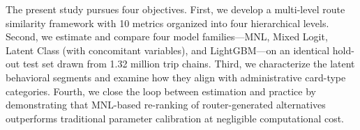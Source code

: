 The present study pursues four objectives. First, we develop a multi-level
route similarity framework with 10 metrics organized into four hierarchical
levels. Second, we estimate and compare four model families---MNL, Mixed
Logit, Latent Class (with concomitant variables), and LightGBM---on an
identical hold-out test set drawn from 1.32 million trip chains. Third, we
characterize the latent behavioral segments and examine how they align with
administrative card-type categories. Fourth, we close the loop between
estimation and practice by demonstrating that MNL-based re-ranking of
router-generated alternatives outperforms traditional parameter calibration at
negligible computational cost.
